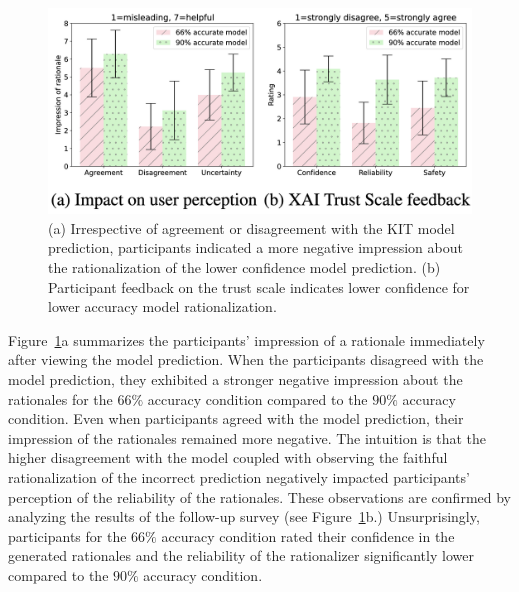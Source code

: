\begin{figure} 
\vspace{-10pt}
    \centering
    \includegraphics[width=0.6\linewidth]{submissions/Estevam2024/figures/xai-trust.png}
 
  \caption{(a) Irrespective of agreement or disagreement with the KIT model prediction, participants indicated a more negative impression about the rationalization of the lower confidence model prediction. (b) Participant feedback on the trust scale indicates lower confidence for lower accuracy model rationalization.}
  \label{fig:xai_rationale} 

\end{figure}

Figure~\ref{fig:xai_rationale}a \cite{mishra2023characterizing} summarizes the participants' impression of a rationale immediately after viewing the model prediction. When the participants disagreed with the model prediction, they exhibited a stronger negative impression about the rationales for the $66\%$ accuracy condition compared to the $90\%$ accuracy condition. Even when participants agreed with the model prediction, their impression of the rationales remained more negative. The intuition is that the higher disagreement with the model coupled with observing the faithful rationalization of the incorrect prediction negatively impacted participants' perception of the reliability of the rationales. These observations are confirmed by analyzing the results of the follow-up survey (see Figure~\ref{fig:xai_rationale}b.)  Unsurprisingly, participants for the $66\%$ accuracy condition rated their confidence in the generated rationales and the reliability of the rationalizer significantly lower compared to the $90\%$ accuracy condition.


